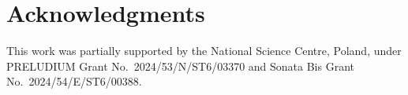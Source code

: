 \section*{Acknowledgments}
{\raggedright
This work was partially supported by the National Science Centre, Poland, under PRELUDIUM Grant No.\ 2024/53/N/ST6/03370 and Sonata Bis Grant No.\ 2024/54/E/ST6/00388.
\par}
